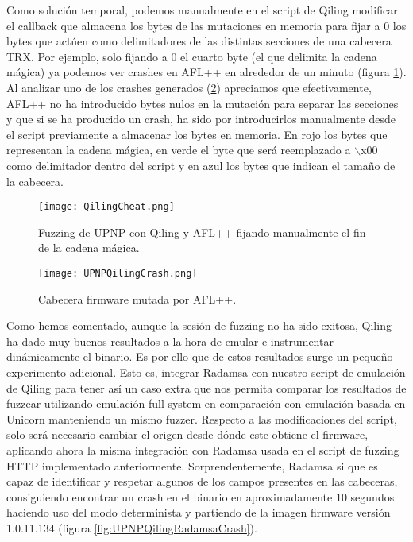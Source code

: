Como solución temporal, podemos manualmente en el script de Qiling modificar el callback que almacena los bytes de las mutaciones en memoria para fijar a 0
los bytes que actúen como delimitadores de las distintas secciones de una cabecera TRX. Por ejemplo, solo fijando a 0 el cuarto byte
(el que delimita la cadena mágica) ya podemos ver crashes en AFL++ en alrededor de un minuto (figura \ref{fig:QilingCheat}). Al analizar uno 
de los crashes generados (\ref{fig:UPNPQilingCrash}) apreciamos que efectivamente, AFL++ no ha introducido bytes nulos en la mutación para
separar las secciones y que si se ha producido un crash, ha sido por introducirlos manualmente desde el script previamente a almacenar los bytes en memoria.
En rojo los bytes que representan la cadena mágica, en verde el byte que será reemplazado a $\backslash$x00 como delimitador dentro del script y en
azul los bytes que indican el tamaño de la cabecera.

\begin{figure}[H]
    \centering
    \texttt{[image: QilingCheat.png]}
    \caption{Fuzzing de UPNP con Qiling y AFL++ fijando manualmente el fin de la cadena mágica.}
    \label{fig:QilingCheat}
\end{figure}

\begin{figure}[H]
    \centering
    \texttt{[image: UPNPQilingCrash.png]}
    \caption{Cabecera firmware mutada por AFL++.}
    \label{fig:UPNPQilingCrash}
\end{figure}

Como hemos comentado, aunque la sesión de fuzzing no ha sido exitosa, Qiling ha dado muy buenos resultados a la hora de emular e instrumentar dinámicamente 
el binario. Es por ello que de estos resultados surge un pequeño experimento adicional. Esto es, integrar Radamsa con nuestro script de emulación de Qiling
para tener así un caso extra que nos permita comparar los resultados de fuzzear utilizando emulación full-system en comparación con emulación basada en Unicorn 
manteniendo un mismo fuzzer. Respecto a las modificaciones del script, solo será necesario cambiar el origen desde dónde este obtiene el firmware, aplicando ahora la misma
integración con Radamsa usada en el script de fuzzing HTTP implementado anteriormente. Sorprendentemente, Radamsa
si que es capaz de identificar y respetar algunos de los campos presentes en las cabeceras, consiguiendo encontrar un crash en el binario
en aproximadamente 10 segundos haciendo uso del modo determinista y partiendo de la imagen firmware versión 1.0.11.134 (figura \ref{fig:UPNPQilingRadamsaCrash}).

